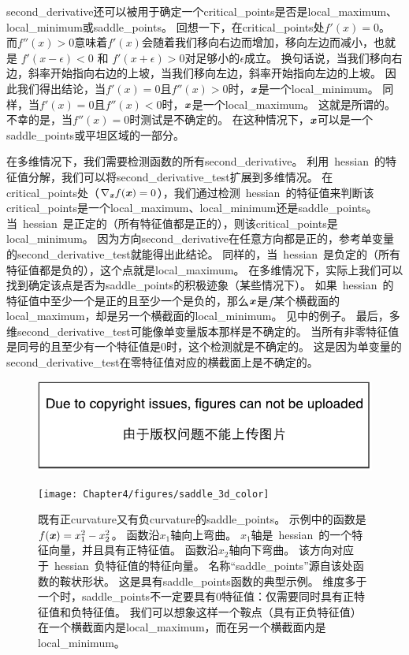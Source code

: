 \gls{second_derivative}还可以被用于确定一个\gls{critical_points}是否是\gls{local_maximum}、\gls{local_minimum}或\gls{saddle_points}。
回想一下，在\gls{critical_points}处$f'(x) = 0$。
而$f''(x) > 0$意味着$f'(x)$会随着我们移向右边而增加，移向左边而减小，也就是 $f'(x - \epsilon) < 0$ 和 $f'(x+\epsilon)>0$对足够小的$\epsilon$成立。 换句话说，当我们移向右边，斜率开始指向右边的上坡，当我们移向左边，斜率开始指向左边的上坡。
因此我们得出结论，当$f'(x) = 0$且$f''(x) > 0$时，$\boldsymbol{\mathit{x}}$是一个\gls{local_minimum}。
同样，当$f'(x) = 0$且$f''(x) < 0$时，$\boldsymbol{\mathit{x}}$是一个\gls{local_maximum}。
这就是所谓的。
不幸的是，当$f''(x) = 0$时测试是不确定的。
在这种情况下，$\boldsymbol{\mathit{x}}$可以是一个\gls{saddle_points}或平坦区域的一部分。


在多维情况下，我们需要检测函数的所有\gls{second_derivative}。
利用~\gls{hessian}~的特征值分解，我们可以将\gls{second_derivative_test}扩展到多维情况。
在\gls{critical_points}处（$\nabla_{\boldsymbol{\mathit{x}}} f(\boldsymbol{\mathit{x}}) = 0$），我们通过检测~\gls{hessian}~的特征值来判断该\gls{critical_points}是一个\gls{local_maximum}、\gls{local_minimum}还是\gls{saddle_points}。
当~\gls{hessian}~是正定的（所有特征值都是正的），则该\gls{critical_points}是\gls{local_minimum}。
因为方向\gls{second_derivative}在任意方向都是正的，参考单变量的\gls{second_derivative_test}就能得出此结论。
同样的，当~\gls{hessian}~是负定的（所有特征值都是负的），这个点就是\gls{local_maximum}。
在多维情况下，实际上我们可以找到确定该点是否为\gls{saddle_points}的积极迹象（某些情况下）。
如果~\gls{hessian}~的特征值中至少一个是正的且至少一个是负的，那么$\boldsymbol{\mathit{x}}$是$f$某个横截面的\gls{local_maximum}，却是另一个横截面的\gls{local_minimum}。
见中的例子。
最后，多维\gls{second_derivative_test}可能像单变量版本那样是不确定的。
当所有非零特征值是同号的且至少有一个特征值是$0$时，这个检测就是不确定的。
这是因为单变量的\gls{second_derivative_test}在零特征值对应的横截面上是不确定的。
\begin{figure}[!htb]
\ifOpenSource
\centerline{\includegraphics{figure.pdf}}
\else
\centerline{\texttt{[image: Chapter4/figures/saddle\_3d\_color]}}
\fi
\caption{既有正\gls{curvature}又有负\gls{curvature}的\gls{saddle_points}。
示例中的函数是$f(\boldsymbol{\mathit{x}}) = x_1^2 - x_2^2$。
函数沿$x_1$轴向上弯曲。
$x_1$轴是~\gls{hessian}~的一个特征向量，并且具有正特征值。
函数沿$x_2$轴向下弯曲。
该方向对应于~\gls{hessian}~负特征值的特征向量。
名称``\gls{saddle_points}''源自该处函数的鞍状形状。
这是具有\gls{saddle_points}函数的典型示例。
维度多于一个时，\gls{saddle_points}不一定要具有0特征值：仅需要同时具有正特征值和负特征值。
我们可以想象这样一个鞍点（具有正负特征值）在一个横截面内是\gls{local_maximum}，而在另一个横截面内是\gls{local_minimum}。
}
\label{fig:chap4_saddle_3d_color}
\end{figure}

